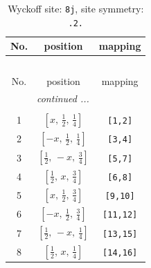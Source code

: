 \documentclass[fleqn,8pt]{jsarticle}
\begin{document}
\begin{longtable}{ccc}
\caption{Wyckoff site: {\tt 8j}, site symmetry: {\tt .2.}}
 \\
 \hline \hline
No. & position & mapping \\ \hline \endfirsthead

\multicolumn{2}{l}{\tablename\ \thetable{}} \\
 \hline \hline
No. & position & mapping \\ \hline \endhead

 \hline \hline
\multicolumn{2}{r}{\footnotesize\it continued ...} \\ \endfoot

 \hline \hline
\multicolumn{2}{r}{} \\ \endlastfoot

1 & $\left[ x,\, \frac{1}{2},\, \frac{1}{4} \right]$ & {\tt [1,2]} \\ \hline
2 & $\left[ - x,\, \frac{1}{2},\, \frac{1}{4} \right]$ & {\tt [3,4]} \\ \hline
3 & $\left[ \frac{1}{2},\, - x,\, \frac{3}{4} \right]$ & {\tt [5,7]} \\ \hline
4 & $\left[ \frac{1}{2},\, x,\, \frac{3}{4} \right]$ & {\tt [6,8]} \\ \hline
5 & $\left[ x,\, \frac{1}{2},\, \frac{3}{4} \right]$ & {\tt [9,10]} \\ \hline
6 & $\left[ - x,\, \frac{1}{2},\, \frac{3}{4} \right]$ & {\tt [11,12]} \\ \hline
7 & $\left[ \frac{1}{2},\, - x,\, \frac{1}{4} \right]$ & {\tt [13,15]} \\ \hline
8 & $\left[ \frac{1}{2},\, x,\, \frac{1}{4} \right]$ & {\tt [14,16]} \\
\end{longtable}
\renewcommand{\arraystretch}{1.2}
\end{document}
